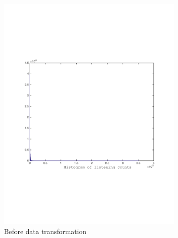 \begin{figure}[h]
  \centering
  \begin{subfigure}[b]{0.45\textwidth}
   \includegraphics[width=\textwidth]{figures/histYtrain_crop.pdf}
    \caption{Before data transformation}
  \end{subfigure}
  \begin{subfigure}[b]{0.45\textwidth}

\end{subfigure}
\end{figure}
